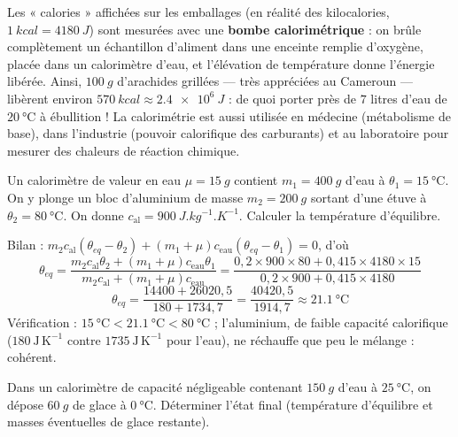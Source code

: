 \documentclass[11pt]{article}
\begin{document}
\begin{savaistu}
Les « calories » affichées sur les emballages (en réalité des kilocalories, $\SI{1}{kcal} = \SI{4180}{J}$) sont mesurées avec une \textbf{bombe calorimétrique} : on brûle complètement un échantillon d'aliment dans une enceinte remplie d'oxygène, placée dans un calorimètre d'eau, et l'élévation de température donne l'énergie libérée. Ainsi, $\SI{100}{g}$ d'arachides grillées — très appréciées au Cameroun — libèrent environ $\SI{570}{kcal} \approx \SI{2,4e6}{J}$ : de quoi porter près de $7$ litres d'eau de $\SI{20}{\celsius}$ à ébullition ! La calorimétrie est aussi utilisée en médecine (métabolisme de base), dans l'industrie (pouvoir calorifique des carburants) et au laboratoire pour mesurer des chaleurs de réaction chimique.
\end{savaistu}

\begin{exercice}
Un calorimètre de valeur en eau $\mu = \SI{15}{g}$ contient $m_1 = \SI{400}{g}$ d'eau à $\theta_1 = \SI{15}{\celsius}$. On y plonge un bloc d'aluminium de masse $m_2 = \SI{200}{g}$ sortant d'une étuve à $\theta_2 = \SI{80}{\celsius}$. On donne $c_{\mathrm{al}} = \SI{900}{J.kg^{-1}.K^{-1}}$. Calculer la température d'équilibre.
\end{exercice}

\begin{corrige}[Exercice 1]
Bilan : $m_2 c_{\mathrm{al}}(\theta_{eq}-\theta_2) + (m_1+\mu)c_{\mathrm{eau}}(\theta_{eq}-\theta_1) = 0$, d'où
\[ \theta_{eq} = \frac{m_2 c_{\mathrm{al}}\theta_2 + (m_1+\mu)c_{\mathrm{eau}}\theta_1}{m_2 c_{\mathrm{al}} + (m_1+\mu)c_{\mathrm{eau}}} = \frac{0{,}2\times 900\times 80 + 0{,}415\times 4180\times 15}{0{,}2\times 900 + 0{,}415\times 4180} \]
\[ \theta_{eq} = \frac{14400 + 26020{,}5}{180 + 1734{,}7} = \frac{40420{,}5}{1914{,}7} \approx \SI{21,1}{\celsius} \]
Vérification : $\SI{15}{\celsius} < \SI{21,1}{\celsius} < \SI{80}{\celsius}$ ; l'aluminium, de faible capacité calorifique ($180\ \mathrm{J\,K^{-1}}$ contre $1735\ \mathrm{J\,K^{-1}}$ pour l'eau), ne réchauffe que peu le mélange : cohérent.
\end{corrige}

\begin{exercice}
Dans un calorimètre de capacité négligeable contenant $\SI{150}{g}$ d'eau à $\SI{25}{\celsius}$, on dépose $\SI{60}{g}$ de glace à $\SI{0}{\celsius}$. Déterminer l'état final (température d'équilibre et masses éventuelles de glace restante).
\end{exercice}
\end{document}
